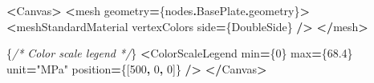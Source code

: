\documentclass[
]{article}
\newenvironment{Shaded}{\begin{snugshade}}{\end{snugshade}}
\newcommand{\AttributeTok}[1]{\textcolor[rgb]{0.13,0.29,0.53}{#1}}
\newcommand{\CommentTok}[1]{\textcolor[rgb]{0.56,0.35,0.01}{\textit{#1}}}
\newcommand{\DecValTok}[1]{\textcolor[rgb]{0.00,0.00,0.81}{#1}}
\newcommand{\FloatTok}[1]{\textcolor[rgb]{0.00,0.00,0.81}{#1}}
\newcommand{\NormalTok}[1]{#1}
\newcommand{\OperatorTok}[1]{\textcolor[rgb]{0.81,0.36,0.00}{\textbf{#1}}}
\newcommand{\StringTok}[1]{\textcolor[rgb]{0.31,0.60,0.02}{#1}}
\begin{document}
\begin{Shaded}
\begin{Highlighting}[]
      \OperatorTok{\textless{}}\NormalTok{Canvas}\OperatorTok{\textgreater{}}
        \OperatorTok{\textless{}}\NormalTok{mesh geometry}\OperatorTok{=}\NormalTok{\{nodes}\OperatorTok{.}\AttributeTok{BasePlate}\OperatorTok{.}\AttributeTok{geometry}\NormalTok{\}}\OperatorTok{\textgreater{}}
          \OperatorTok{\textless{}}\NormalTok{meshStandardMaterial}
\NormalTok{            vertexColors}
\NormalTok{            side}\OperatorTok{=}\NormalTok{\{DoubleSide\}}
          \OperatorTok{/\textgreater{}}
        \OperatorTok{\textless{}/}\NormalTok{mesh}\OperatorTok{\textgreater{}}

\NormalTok{        \{}\CommentTok{/* Color scale legend */}\NormalTok{\}}
        \OperatorTok{\textless{}}\NormalTok{ColorScaleLegend}
\NormalTok{          min}\OperatorTok{=}\NormalTok{\{}\DecValTok{0}\NormalTok{\}}
\NormalTok{          max}\OperatorTok{=}\NormalTok{\{}\FloatTok{68.4}\NormalTok{\}}
\NormalTok{          unit}\OperatorTok{=}\StringTok{"MPa"}
\NormalTok{          position}\OperatorTok{=}\NormalTok{\{[}\DecValTok{500}\OperatorTok{,} \DecValTok{0}\OperatorTok{,} \DecValTok{0}\NormalTok{]\}}
        \OperatorTok{/\textgreater{}}
      \OperatorTok{\textless{}/}\NormalTok{Canvas}\OperatorTok{\textgreater{}}


\end{Highlighting}
\end{Shaded}
\end{document}
